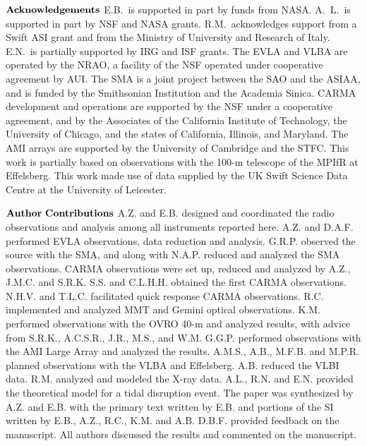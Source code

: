
\clearpage


\noindent$\bf{Acknowledgements}$  E.B.~is supported in part by funds 
from NASA.  A.~L.~is supported in part by NSF and NASA grants.  
R.M.~acknowledges support from a Swift ASI grant and from the Ministry 
of University and Research of Italy.  E.N.~is partially supported by IRG 
and ISF grants.  The EVLA and VLBA are operated by the NRAO, a facility
of the NSF operated under cooperative agreement by AUI.  The SMA is
a joint project between the SAO and the ASIAA, and is funded by the 
Smithsonian Institution and the Academia Sinica.  CARMA development and 
operations are supported by the NSF under a cooperative 
agreement, and by the Associates of the California Institute of Technology, 
the University of Chicago, and the states of California, Illinois, and Maryland.
The AMI arrays are supported by the University of Cambridge and the STFC.  
This work is partially based on observations with the 100-m telescope of 
the MPIfR at Effelsberg.  This work made use of data supplied by the UK 
Swift Science Data Centre at the University of Leicester.

\hspace{1in}

\noindent$\bf{Author~Contributions}$  A.Z. and E.B. designed and 
coordinated the radio observations and 
analysis among all instruments reported here.  A.Z. and D.A.F. 
performed EVLA observations, data reduction and analysis.  
G.R.P. observed the source with the SMA, and along with N.A.P. 
reduced and analyzed the SMA observations.  CARMA observations 
were set up, reduced and analyzed by A.Z., J.M.C. and S.R.K.  
S.S. and C.L.H.H. obtained the first CARMA observations.  
N.H.V. and T.L.C. facilitated quick response CARMA observations.  
R.C. implemented and analyzed MMT and Gemini optical observations.  
K.M. performed observations with the OVRO 40-m and analyzed results, 
with advice from S.R.K., A.C.S.R., J.R., M.S., and W.M.  G.G.P. 
performed observations with the AMI Large Array and analyzed the 
results.  A.M.S., A.B., M.F.B. and M.P.R. planned observations 
with the VLBA and Effelsberg.  A.B. reduced the VLBI data.  
R.M. analyzed and modeled the X-ray data.  A.L., R.N. and E.N. 
provided the theoretical model for a tidal disruption event.  
The paper was synthesized by A.Z. and E.B. with the primary text 
written by E.B. and portions of the SI written by E.B., A.Z., R.C., 
K.M. and A.B.  D.B.F. provided feedback on the manuscript.   
All authors discussed the results and commented on the manuscript.

